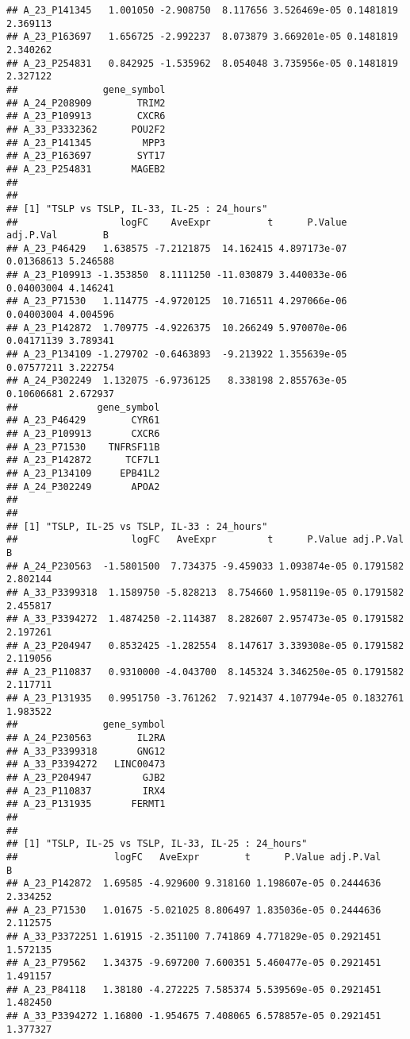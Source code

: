 \documentclass[
]{article}
\begin{document}
\begin{verbatim}
## A_23_P141345   1.001050 -2.908750  8.117656 3.526469e-05 0.1481819 2.369113
## A_23_P163697   1.656725 -2.992237  8.073879 3.669201e-05 0.1481819 2.340262
## A_23_P254831   0.842925 -1.535962  8.054048 3.735956e-05 0.1481819 2.327122
##               gene_symbol
## A_24_P208909        TRIM2
## A_23_P109913        CXCR6
## A_33_P3332362      POU2F2
## A_23_P141345         MPP3
## A_23_P163697        SYT17
## A_23_P254831       MAGEB2
## 
## 
## [1] "TSLP vs TSLP, IL-33, IL-25 : 24_hours"
##                  logFC    AveExpr          t      P.Value  adj.P.Val        B
## A_23_P46429   1.638575 -7.2121875  14.162415 4.897173e-07 0.01368613 5.246588
## A_23_P109913 -1.353850  8.1111250 -11.030879 3.440033e-06 0.04003004 4.146241
## A_23_P71530   1.114775 -4.9720125  10.716511 4.297066e-06 0.04003004 4.004596
## A_23_P142872  1.709775 -4.9226375  10.266249 5.970070e-06 0.04171139 3.789341
## A_23_P134109 -1.279702 -0.6463893  -9.213922 1.355639e-05 0.07577211 3.222754
## A_24_P302249  1.132075 -6.9736125   8.338198 2.855763e-05 0.10606681 2.672937
##              gene_symbol
## A_23_P46429        CYR61
## A_23_P109913       CXCR6
## A_23_P71530    TNFRSF11B
## A_23_P142872      TCF7L1
## A_23_P134109     EPB41L2
## A_24_P302249       APOA2
## 
## 
## [1] "TSLP, IL-25 vs TSLP, IL-33 : 24_hours"
##                    logFC   AveExpr         t      P.Value adj.P.Val        B
## A_24_P230563  -1.5801500  7.734375 -9.459033 1.093874e-05 0.1791582 2.802144
## A_33_P3399318  1.1589750 -5.828213  8.754660 1.958119e-05 0.1791582 2.455817
## A_33_P3394272  1.4874250 -2.114387  8.282607 2.957473e-05 0.1791582 2.197261
## A_23_P204947   0.8532425 -1.282554  8.147617 3.339308e-05 0.1791582 2.119056
## A_23_P110837   0.9310000 -4.043700  8.145324 3.346250e-05 0.1791582 2.117711
## A_23_P131935   0.9951750 -3.761262  7.921437 4.107794e-05 0.1832761 1.983522
##               gene_symbol
## A_24_P230563        IL2RA
## A_33_P3399318       GNG12
## A_33_P3394272   LINC00473
## A_23_P204947         GJB2
## A_23_P110837         IRX4
## A_23_P131935       FERMT1
## 
## 
## [1] "TSLP, IL-25 vs TSLP, IL-33, IL-25 : 24_hours"
##                 logFC   AveExpr        t      P.Value adj.P.Val        B
## A_23_P142872  1.69585 -4.929600 9.318160 1.198607e-05 0.2444636 2.334252
## A_23_P71530   1.01675 -5.021025 8.806497 1.835036e-05 0.2444636 2.112575
## A_33_P3372251 1.61915 -2.351100 7.741869 4.771829e-05 0.2921451 1.572135
## A_23_P79562   1.34375 -9.697200 7.600351 5.460477e-05 0.2921451 1.491157
## A_23_P84118   1.38180 -4.272225 7.585374 5.539569e-05 0.2921451 1.482450
## A_33_P3394272 1.16800 -1.954675 7.408065 6.578857e-05 0.2921451 1.377327

\end{verbatim}
\end{document}
